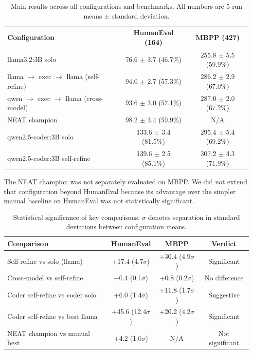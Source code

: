\documentclass{article}
\begin{document}
\begin{table}[h]
\centering
\caption{Main results across all configurations and benchmarks. All numbers are 5-run means $\pm$ standard deviation.}
\label{tab:main-results}
\begin{tabularx}{\linewidth}{Xcc}
\hline
\textbf{Configuration} & \textbf{HumanEval (164)} & \textbf{MBPP (427)} \\
\hline
llama3.2:3B solo & 76.6 $\pm$ 3.7 (46.7\%) & 255.8 $\pm$ 5.5 (59.9\%) \\
llama $\rightarrow$ exec $\rightarrow$ llama (self-refine) & 94.0 $\pm$ 2.7 (57.3\%) & 286.2 $\pm$ 2.9 (67.0\%) \\
qwen $\rightarrow$ exec $\rightarrow$ llama (cross-model) & 93.6 $\pm$ 3.0 (57.1\%) & 287.0 $\pm$ 2.0 (67.2\%) \\
NEAT champion & 98.2 $\pm$ 3.4 (59.9\%) & N/A \\
qwen2.5-coder:3B solo & 133.6 $\pm$ 3.4 (81.5\%) & 295.4 $\pm$ 5.4 (69.2\%) \\
qwen2.5-coder:3B self-refine & 139.6 $\pm$ 2.5 (85.1\%) & 307.2 $\pm$ 4.3 (71.9\%) \\
\hline
\end{tabularx}
\end{table}

The NEAT champion was not separately evaluated on MBPP. We did not extend that configuration beyond HumanEval because its advantage over the simpler manual baseline on HumanEval was not statistically significant.

\begin{table}[h]
\centering
\caption{Statistical significance of key comparisons. $\sigma$ denotes separation in standard deviations between configuration means.}
\label{tab:significance}
\begin{tabularx}{\linewidth}{>{\RaggedRight\arraybackslash}Xccc}
\hline
\textbf{Comparison} & \textbf{HumanEval} & \textbf{MBPP} & \textbf{Verdict} \\
\hline
Self-refine vs solo (llama) & +17.4 (4.7$\sigma$) & +30.4 (4.9$\sigma$) & Significant \\
Cross-model vs self-refine & $-$0.4 (0.1$\sigma$) & +0.8 (0.2$\sigma$) & No difference \\
Coder self-refine vs coder solo & +6.0 (1.4$\sigma$) & +11.8 (1.7$\sigma$) & Suggestive \\
Coder self-refine vs best llama & +45.6 (12.4$\sigma$) & +20.2 (4.2$\sigma$) & Significant \\
NEAT champion vs manual best & +4.2 (1.0$\sigma$) & N/A & Not significant \\
\hline
\end{tabularx}
\end{table}
\end{document}
